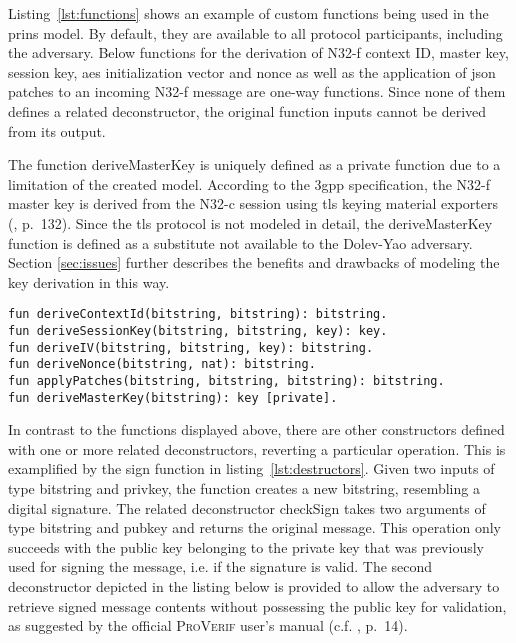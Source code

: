 Listing~\ref{lst:functions} shows an example of custom functions being used in the \gls{prins} model.
By default, they are available to all protocol participants, including the adversary.
Below functions for the derivation of N32-f context ID, master key, session key, \gls{aes} initialization vector and nonce as well as the application of json patches to an incoming N32-f message are one-way functions.
Since none of them defines a related deconstructor, the original function inputs cannot be derived from its output.

The function {\sffamily deriveMasterKey} is uniquely defined as a private function due to a limitation of the created model.
According to the \gls{3gpp} specification, the N32-f master key is derived from the N32-c session using \gls{tls} keying material exporters (\cite{3gpp.33.501}, p.~132).
Since the \gls{tls} protocol is not modeled in detail, the {\sffamily deriveMasterKey} function is defined as a substitute not available to the Dolev-Yao adversary.
Section \ref{sec:issues} further describes the benefits and drawbacks of modeling the key derivation in this way.

\begin{lstlisting}[caption={Definition of custom one-way functions},label={lst:functions},firstnumber=124]
fun deriveContextId(bitstring, bitstring): bitstring.
fun deriveSessionKey(bitstring, bitstring, key): key.
fun deriveIV(bitstring, bitstring, key): bitstring.
fun deriveNonce(bitstring, nat): bitstring.
fun applyPatches(bitstring, bitstring, bitstring): bitstring.
fun deriveMasterKey(bitstring): key [private].
\end{lstlisting}

In contrast to the functions displayed above, there are other constructors defined with one or more related deconstructors, reverting a particular operation.
This is examplified by the {\sffamily sign} function in listing~\ref{lst:destructors}.
Given two inputs of type {\sffamily bitstring} and {\sffamily privkey}, the function creates a new {\sffamily bitstring}, resembling a digital signature.
The related deconstructor {\sffamily checkSign} takes two arguments of type {\sffamily bitstring} and {\sffamily pubkey} and returns the original message.
This operation only succeeds with the public key belonging to the private key that was previously used for signing the message, i.e. if the signature is valid.
The second deconstructor depicted in the listing below is provided to allow the adversary to retrieve signed message contents without possessing the public key for validation, as suggested by the official \textsc{ProVerif} user's manual (c.f. \cite{blanchet2020proverif}, p.~14).

